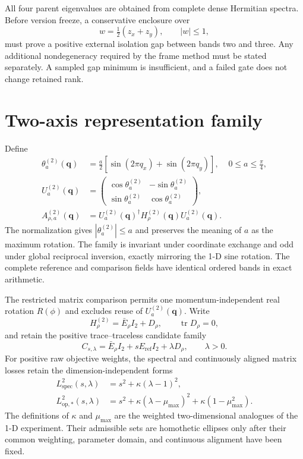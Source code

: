 \documentclass[11pt]{article}
\begin{document}
All four parent eigenvalues are obtained from complete dense Hermitian spectra. Before
version freeze, a conservative enclosure over
\begin{equation}
 w=\tfrac12(z_x+z_y),\qquad |w|\le1,
\end{equation}
must prove a positive external isolation gap between bands two and three. Any additional
nondegeneracy required by the frame method must be stated separately. A sampled gap
minimum is insufficient, and a failed gate does not change retained rank.

\section{Two-axis representation family}

Define
\begin{align}
 \theta_a^{(2)}(\mathbf q)&=
 \frac a2\left[\sin(2\pi q_x)+\sin(2\pi q_y)\right],
 &0\le a\le\frac\pi4,\\
 U_a^{(2)}(\mathbf q)&=
 \begin{pmatrix}
 \cos\theta_a^{(2)}&-\sin\theta_a^{(2)}\\
 \sin\theta_a^{(2)}& \cos\theta_a^{(2)}
 \end{pmatrix},\\
 A_{\rho,a}^{(2)}(\mathbf q)
 &=U_a^{(2)}(\mathbf q)^\dagger
 H_\rho^{(2)}(\mathbf q)U_a^{(2)}(\mathbf q).
 \label{eq:comparison}
\end{align}
The normalization gives $|\theta_a^{(2)}|\le a$ and preserves the meaning of $a$ as the
maximum rotation. The family is invariant under coordinate exchange and odd under
global reciprocal inversion, exactly mirroring the 1-D sine rotation. The complete
reference and comparison fields have identical ordered bands in exact arithmetic.

The restricted matrix comparison permits one momentum-independent real rotation
$R(\phi)$ and excludes reuse of $U_a^{(2)}(\mathbf q)$. Write
\begin{equation}
 H_\rho^{(2)}=\bar E_\rho I_2+D_\rho,
 \qquad \operatorname{tr}D_\rho=0,
\end{equation}
and retain the positive trace--traceless candidate family
\begin{equation}
 C_{s,\lambda}=\bar E_\rho I_2+sE_{\mathrm{ref}}I_2+\lambda D_\rho,
 \qquad \lambda>0.
\end{equation}
For positive raw objective weights, the spectral and continuously aligned matrix losses
retain the dimension-independent forms
\begin{align}
 L_{\mathrm{spec}}^2(s,\lambda)
 &=s^2+\kappa(\lambda-1)^2,\\
 L_{\mathrm{op},*}^2(s,\lambda)
 &=s^2+\kappa(\lambda-\mu_{\max})^2
   +\kappa(1-\mu_{\max}^2).
 \label{eq:losses}
\end{align}
The definitions of $\kappa$ and $\mu_{\max}$ are the weighted two-dimensional analogues
of the 1-D experiment. Their admissible sets are homothetic ellipses only after their
common weighting, parameter domain, and continuous alignment have been fixed.
\end{document}
